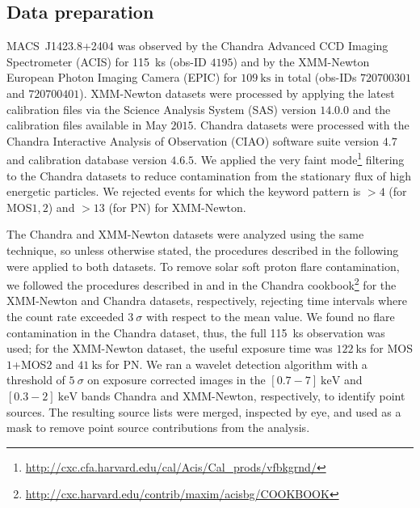 \documentclass[traditabstract]{aa}
\begin{document}
\subsection{Data preparation}
\mbox{MACS~J1423.8+2404} was observed by the Chandra Advanced CCD Imaging Spectrometer (ACIS) for \SI{115}{\kilo\second} (obs-ID $4195$) and by the XMM-Newton European Photon Imaging Camera (EPIC) for $\SI{109}{\kilo\second}$ in total (obs-IDs $720700301$ and $720700401$). XMM-Newton datasets were processed by applying the latest calibration files via the Science Analysis System (SAS) version $14.0.0$ and the calibration files available in May $2015$. Chandra datasets were processed with the Chandra Interactive Analysis of Observation (CIAO) software suite version $4.7$ and calibration database version $4.6.5$.  We applied the very faint mode\footnote{\label{fn1}\url{http://cxc.cfa.harvard.edu/cal/Acis/Cal\_prods/vfbkgrnd/}} filtering to the Chandra datasets to reduce contamination from the stationary flux of high
energetic particles.  We rejected events for which the keyword {\sc pattern}  is $> 4$ (for MOS$1,2$) and $>13$ (for PN) for XMM-Newton. %

The Chandra and XMM-Newton datasets were analyzed using the same technique, so unless otherwise stated, the procedures described in the following were applied to both datasets. To remove solar soft proton flare contamination, we followed the procedures described in \cite{pratt2007} and in the Chandra {\sc cookbook}\footnote{\label{fn2}\url{http://cxc.harvard.edu/contrib/maxim/acisbg/COOKBOOK}} for the XMM-Newton and Chandra datasets, respectively, rejecting time intervals where the count rate exceeded $3 \ \sigma$ with respect to the mean value. We found no flare contamination in the Chandra dataset, thus, the full 115~ks observation was used; for the XMM-Newton dataset, the useful exposure time was $\SI{122}{\kilo\second}$ for MOS$1$+MOS$2$ and $\SI{41}{\kilo\second}$ for PN. We ran a wavelet detection algorithm with a threshold of $5 \ \sigma$ on exposure corrected images in the $[0.7-7] \ \si{\kilo\electronvolt}$ and $[0.3-2] \ \si{\kilo\electronvolt}$ bands Chandra and XMM-Newton, respectively, to identify point sources. The resulting source lists were merged, inspected by eye, and used as a mask to remove point source contributions from the analysis.

\end{document}
